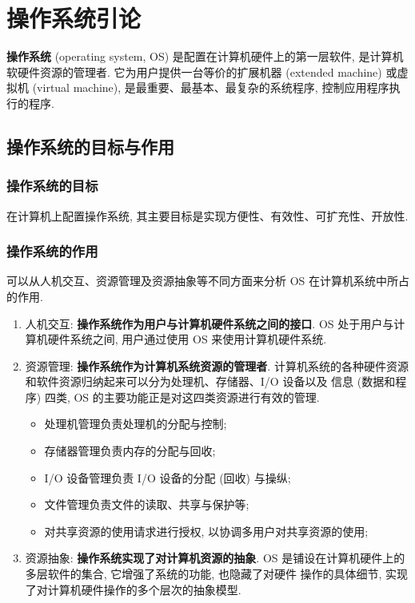 \documentclass[10pt,UTF8]{book} %
\begin{document}
\mainmatter
\chapter{操作系统引论}

\textbf{操作系统} (operating system, OS) 是配置在计算机硬件上的第一层软件,
是计算机软硬件资源的管理者.
它为用户提供一台等价的扩展机器 (extended machine) 或虚拟机 (virtual machine),
是最重要、最基本、最复杂的系统程序, 控制应用程序执行的程序.

\section{操作系统的目标与作用}

\subsection{操作系统的目标}

在计算机上配置操作系统, 其主要目标是实现方便性、有效性、可扩充性、开放性.

\subsection{操作系统的作用}

可以从人机交互、资源管理及资源抽象等不同方面来分析 OS 在计算机系统中所占的作用.
\begin{enumerate}[itemsep=0pt]
    \item 人机交互: \textbf{操作系统作为用户与计算机硬件系统之间的接口}.
    OS 处于用户与计算机硬件系统之间, 用户通过使用 OS 来使用计算机硬件系统.
    \item 资源管理: \textbf{操作系统作为计算机系统资源的管理者}.
    计算机系统的各种硬件资源和软件资源归纳起来可以分为处理机、存储器、I/O 设备以及
    信息 (数据和程序) 四类, OS 的主要功能正是对这四类资源进行有效的管理.
    \begin{itemize}[itemsep=0pt]
        \item 处理机管理负责处理机的分配与控制;
        \item 存储器管理负责内存的分配与回收;
        \item I/O 设备管理负责 I/O 设备的分配 (回收) 与操纵;
        \item 文件管理负责文件的读取、共享与保护等;
        \item 对共享资源的使用请求进行授权, 以协调多用户对共享资源的使用;
    \end{itemize}
    \item 资源抽象: \textbf{操作系统实现了对计算机资源的抽象}.
    OS 是铺设在计算机硬件上的多层软件的集合, 它增强了系统的功能, 也隐藏了对硬件
    操作的具体细节, 实现了对计算机硬件操作的多个层次的抽象模型.
\end{enumerate}
\end{document}
